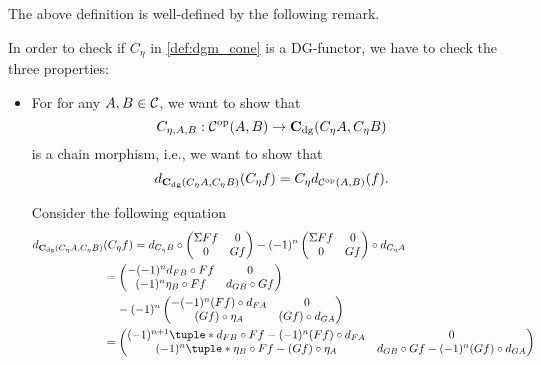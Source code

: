 The above definition is well-defined by the following remark.
\begin{remark}
    In order to check if \( C_{\eta} \) in \autoref{def:dgm_cone} is a DG-functor, we have to check the three properties:
    \begin{itemize}
        \item {
            For for any \( A, B \in {\mathcal{C}} \), we want to show that
            \[
                C_{\eta, A, B}: {\mathcal{C}}^{\operatorname{op}}(A, B) \to \operatorname{\mathbf{C}}_{\operatorname{dg}}(C_{\eta} A, C_{\eta} B)
            \]
            is a chain morphism, i.e., we want to show that
            \[
                d_{\operatorname{\mathbf{C}}_{\operatorname{dg}}(C_{\eta} A, C_{\eta} B)}(C_{\eta} f) = C_{\eta} d_{{\mathcal{C}}^{\operatorname{op}}(A, B)}(f).
            \]

            Consider the following equation
            \begin{align*}
                d_{\C_{\dg}(C_{\eta} A, C_{\eta} B)}&(C_{\eta} f) = d_{C_{\eta} B} \circ
                \begin{pmatrix}
                    \Sigma F f & 0 \\
                    0 & G f
                \end{pmatrix}
                - (-1)^n
                \begin{pmatrix}
                    \Sigma F f & 0 \\
                    0 & G f
                \end{pmatrix}
                \circ d_{C_{\eta} A} \\
                &=
                \begin{pmatrix}
                    -(-1)^n d_{F B} \circ F f & 0 \\
                    (-1)^n \eta_B \circ F f & d_{G B} \circ G f
                \end{pmatrix} \\
                &\hspace{0.4cm} - (-1)^n
                \begin{pmatrix}
                    -(-1)^n (F f) \circ d_{F A} & 0 \\
                    (G f) \circ \eta_A & (G f) \circ d_{G A}
                \end{pmatrix} \\
                &=
                \begin{pmatrix}
                    (-1)^{n + 1}\tuple*{d_{F B} \circ F f - (-1)^n (F f) \circ d_{F A}} & 0 \\
                    (-1)^n\tuple*{\eta_B \circ F f - (G f) \circ \eta_A} & d_{G B} \circ G f - (-1)^n (G f) \circ d_{G A}

\end{pmatrix}
\end{align*}}
\end{itemize}
\end{remark}
